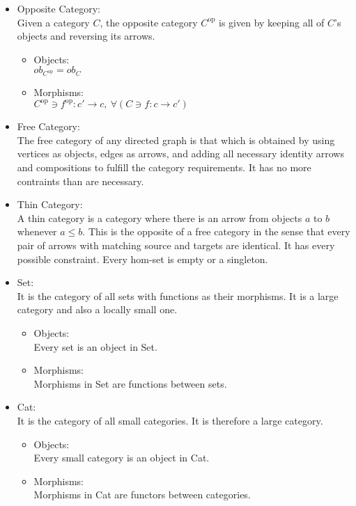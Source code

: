 \begin{itemize}
  \item Opposite Category:\\
    Given a category $C$, the opposite category $C^\mathrm{op}$ is given by
    keeping all of $C$'s objects and reversing its arrows.
    \cite{nlab:opposite_category}
    \begin{itemize}
      \item Objects:\\
        $ob_{C^\mathrm{op}} = ob_C$
      \item Morphisms:\\
        $C^{\mathrm{op}} \ni f^{\mathrm{op}} : c' \to c,
          \ \forall (C \ni f : c \to c')$
    \end{itemize}

  \item Free Category:\\
    The free category of any directed graph is that which is obtained by using
    vertices as objects, edges as arrows, and adding all necessary identity
    arrows and compositions to fulfill the category requirements. It has no
    more contraints than are necessary.

  \item Thin Category:\\
    A thin category is a category where there is an arrow from objects $a$ to
    $b$ whenever $a \leq b$. This is the opposite of a free category in the
    sense that every pair of arrows with matching source and targets are
    identical. It has every possible constraint. Every hom-set is empty or a
    singleton.

  \item Set:\\
    It is the category of all sets with functions as their morphisms.
    It is a large category and also a locally small one. \cite{nlab:set}
    \begin{itemize}
      \item Objects:\\
        Every set is an object in Set.
      \item Morphisms:\\
        Morphisms in Set are functions between sets.
    \end{itemize}

  \item Cat:\\
    It is the category of all small categories. It is therefore a large category.
    \cite{nlab:cat}
    \begin{itemize}
      \item Objects:\\
        Every small category is an object in Cat.
      \item Morphisms:\\
        Morphisms in Cat are functors between categories.
    \end{itemize}
\end{itemize}
